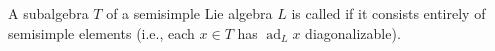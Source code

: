 A subalgebra $T$ of a semisimple Lie algebra $L$ is called  if it consists entirely of semisimple elements (i.e., each $x \in T$ has $\operatorname{ad}_L x$ diagonalizable).
